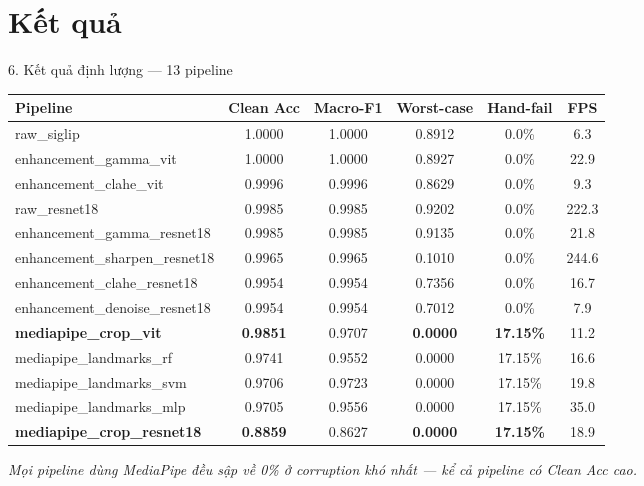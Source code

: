 \documentclass[t, aspectratio=169]{beamer} %
\begin{document}
	\useStyleHustFull
	\useThinBar
	\section{Kết quả}
	\begin{frame}{6. Kết quả định lượng — 13 pipeline}
		\tiny
		\begin{table}
			\centering
			\begin{tabular}{lccccc}
				\toprule
				\textbf{Pipeline} & \textbf{Clean Acc} & \textbf{Macro-F1} & \textbf{Worst-case} & \textbf{Hand-fail} & \textbf{FPS} \\
				\midrule
				raw\_siglip            & 1.0000 & 1.0000 & 0.8912 & 0.0\%   & 6.3 \\
				enhancement\_gamma\_vit & 1.0000 & 1.0000 & 0.8927 & 0.0\%  & 22.9 \\
				enhancement\_clahe\_vit & 0.9996 & 0.9996 & 0.8629 & 0.0\%  & 9.3 \\
				raw\_resnet18           & 0.9985 & 0.9985 & 0.9202 & 0.0\%  & 222.3 \\
				enhancement\_gamma\_resnet18 & 0.9985 & 0.9985 & 0.9135 & 0.0\% & 21.8 \\
				enhancement\_sharpen\_resnet18 & 0.9965 & 0.9965 & \alert{0.1010} & 0.0\% & 244.6 \\
				enhancement\_clahe\_resnet18 & 0.9954 & 0.9954 & 0.7356 & 0.0\% & 16.7 \\
				enhancement\_denoise\_resnet18 & 0.9954 & 0.9954 & 0.7012 & 0.0\% & 7.9 \\
				\textbf{mediapipe\_crop\_vit} & \textbf{0.9851} & 0.9707 & \alert{\textbf{0.0000}} & \textbf{17.15\%} & 11.2 \\
				mediapipe\_landmarks\_rf & 0.9741 & 0.9552 & \alert{0.0000} & 17.15\% & 16.6 \\
				mediapipe\_landmarks\_svm & 0.9706 & 0.9723 & \alert{0.0000} & 17.15\% & 19.8 \\
				mediapipe\_landmarks\_mlp & 0.9705 & 0.9556 & \alert{0.0000} & 17.15\% & 35.0 \\
				\textbf{mediapipe\_crop\_resnet18} & \textbf{0.8859} & 0.8627 & \alert{\textbf{0.0000}} & \textbf{17.15\%} & 18.9 \\
				\bottomrule
			\end{tabular}
		\end{table}
		\footnotesize \textit{Mọi pipeline dùng MediaPipe đều sập về 0\% ở corruption khó nhất — kể cả pipeline có Clean Acc cao.}
	\end{frame}
\end{document}
